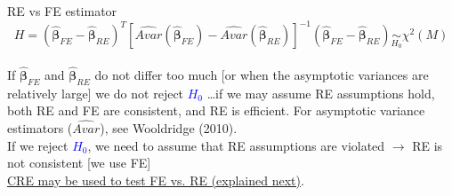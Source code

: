 \documentclass[usenames,dvipsnames]{beamer}
\begin{document}
\begin{frame}{RE vs FE estimator}
\
{\small $$H=(\hat{\bm{\beta}}_{FE} - \hat{\bm{\beta}}_{RE})^T [\widehat{\textit{Avar}}(\hat{\bm{\beta}}_{FE}) - \widehat{\textit{Avar}}(\hat{\bm{\beta}}_{RE})]^{-1} (\hat{\bm{\beta}}_{FE} - \hat{\bm{\beta}}_{RE}) \underset{H_0}{\sim} \chi^2(M)$$}\\
\bigskip
If $\hat{\bm{\beta}}_{FE}$ and $\hat{\bm{\beta}}_{RE}$ do not differ too much [or when the asymptotic variances are relatively large] we do not reject \textcolor{Blue}{$H_0$} \dots if we may assume RE assumptions hold, both RE and FE are consistent, and RE is efficient. For asymptotic variance estimators ($\widehat{\textit{Avar}}$), see Wooldridge (2010).\\ 
\bigskip
If we reject \textcolor{Blue}{$H_0$}, we need to assume that RE assumptions are violated $\rightarrow$ RE is not consistent [we use FE] \\
\underline{CRE may be used to test FE vs. RE (explained next)}.
\end{frame}
\end{document}
